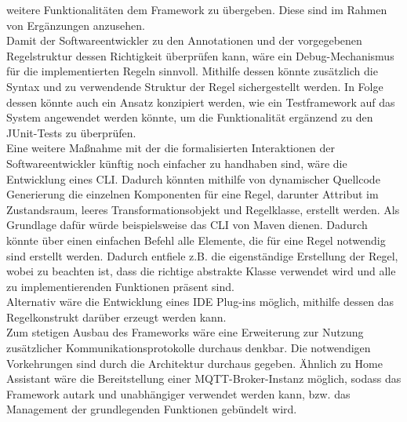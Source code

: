     weitere Funktionalitäten dem Framework zu übergeben. Diese sind im Rahmen von Ergänzungen anzusehen.
    \\
    Damit der Softwareentwickler zu den Annotationen und der vorgegebenen Regelstruktur dessen Richtigkeit überprüfen kann, wäre ein Debug-Mechanismus für die implementierten Regeln sinnvoll. 
    Mithilfe dessen könnte zusätzlich die Syntax und zu verwendende Struktur der Regel sichergestellt werden. In Folge dessen könnte auch ein Ansatz konzipiert werden, wie ein Testframework 
    auf das System angewendet werden könnte, um die Funktionalität ergänzend zu den JUnit-Tests zu überprüfen. 
    \\
    \linebreak
    Eine weitere Maßnahme mit der die formalisierten Interaktionen der Softwareentwickler künftig noch einfacher zu handhaben sind, wäre die Entwicklung eines \ac{CLI}. Dadurch könnten mithilfe 
    von dynamischer Quellcode Generierung die einzelnen Komponenten für eine Regel, darunter Attribut im Zustandsraum, leeres Transformationsobjekt und Regelklasse, erstellt werden. Als Grundlage dafür 
    würde beispielsweise das \acs{CLI} von Maven dienen. Dadurch könnte über einen einfachen Befehl alle Elemente, die für eine Regel notwendig sind erstellt werden. Dadurch entfiele z.B. die 
    eigenständige Erstellung der Regel, wobei zu beachten ist, dass die richtige abstrakte Klasse verwendet wird und alle zu implementierenden Funktionen präsent sind. 
    \\
    Alternativ wäre die Entwicklung eines \ac{IDE} Plug-ins möglich, mithilfe dessen das Regelkonstrukt darüber erzeugt werden kann. 
    \\
    \linebreak
    Zum stetigen Ausbau des Frameworks wäre eine Erweiterung zur Nutzung zusätzlicher Kommunikationsprotokolle durchaus denkbar. Die notwendigen Vorkehrungen sind durch die Architektur durchaus gegeben. 
    Ähnlich zu Home Assistant wäre die Bereitstellung einer \acs{MQTT}-Broker-Instanz möglich, sodass das Framework autark und unabhängiger verwendet werden kann, bzw. das Management der grundlegenden Funktionen 
    gebündelt wird. 
    \\
    \linebreak
    



